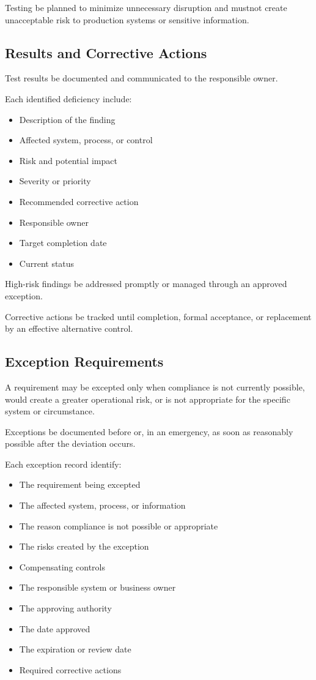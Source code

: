 Testing \must{} be planned to minimize unnecessary disruption and mustnot{} create unacceptable risk to production systems or sensitive information.

\subsection{Results and Corrective Actions}

Test results \must{} be documented and communicated to the responsible owner.

Each identified deficiency \should{} include:
\begin{itemize}
    \item Description of the finding
    \item Affected system, process, or control
    \item Risk and potential impact
    \item Severity or priority
    \item Recommended corrective action
    \item Responsible owner
    \item Target completion date
    \item Current status
\end{itemize}

High-risk findings \must{} be addressed promptly or managed through an approved exception.

Corrective actions \must{} be tracked until completion, formal acceptance, or replacement by an effective alternative control.

\subsection{Exception Requirements}

A requirement may be excepted only when compliance is not currently possible, would create a greater operational risk, or is not appropriate for the specific system or circumstance.

Exceptions \must{} be documented before or, in an emergency, as soon as reasonably possible after the deviation occurs.

Each exception record \must{} identify:
\begin{itemize}
    \item The requirement being excepted
    \item The affected system, process, or information
    \item The reason compliance is not possible or appropriate
    \item The risks created by the exception
    \item Compensating controls
    \item The responsible system or business owner
    \item The approving authority
    \item The date approved
    \item The expiration or review date
    \item Required corrective actions
\end{itemize}

